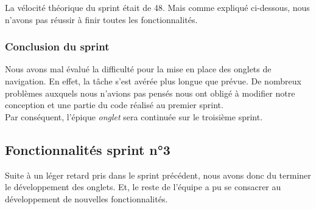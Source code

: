 \documentclass[10pt,a4paper]{article}
\begin{document}
La vélocité théorique du sprint était de 48. Mais comme expliqué ci-dessous, nous n'avons pas réussir à finir toutes les fonctionnalités.

\subsubsection{Conclusion du sprint}
Nous avons mal évalué la difficulté pour la mise en place des onglets de navigation. En effet, la tâche s'est avérée plus longue que prévue. De nombreux problèmes auxquels nous n'avions pas pensés nous ont obligé à modifier notre conception et une partie du code réalisé au premier sprint. \\
Par conséquent, l'épique \textit{onglet} sera continuée sur le troisième sprint.

\newpage

\subsection{Fonctionnalités sprint n°3}
Suite à un léger retard pris dans le sprint précédent, nous avons donc du terminer le développement des onglets. Et, le reste de l'équipe a pu se consacrer au développement de nouvelles fonctionnalités.
\end{document}
